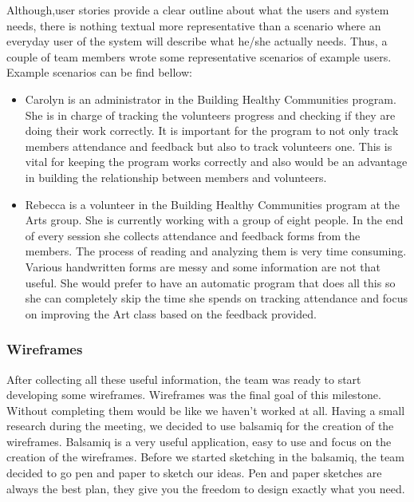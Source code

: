 \documentclass{l3proj}
\begin{document}
Although,user stories provide a clear outline about what the users and system needs, there is nothing textual more representative than a scenario where an everyday user of the system will describe what he/she actually needs. Thus, a couple of team members wrote some representative scenarios of example users. 
Example scenarios can be find bellow:
\begin{itemize}
\item Carolyn is an administrator in the Building Healthy Communities program. She is in charge of tracking the volunteers progress and checking if they are doing their work correctly. It is important for the program to not only track members attendance and feedback but also to track volunteers one. This is vital for keeping the program works correctly and also would be an advantage in building the relationship between members and volunteers.

\item Rebecca is a volunteer in the Building Healthy Communities program at the Arts group. She is currently working with a group of eight people. In the end of every session she collects attendance and feedback forms from the members. The process of reading and analyzing them is very time consuming. Various handwritten forms are messy and some information are not that useful. She would prefer to have an automatic program that does all this so she can completely skip the time she spends on tracking attendance and focus on improving the Art class based on the feedback provided.

\end{itemize}

\subsubsection{Wireframes}
\label{wireframes}

After collecting all these useful information, the team was ready to start developing some wireframes. Wireframes was the final goal of this milestone. Without completing them would be like we haven't worked at all. Having a small research during the meeting, we decided to use balsamiq for the creation of the wireframes. Balsamiq is a very useful application, easy to use and focus on the creation of the wireframes. Before we started sketching in the balsamiq, the team decided to go pen and paper to sketch our ideas. Pen and paper sketches are always the best plan, they give you the freedom to design exactly what you need. 
\end{document}

